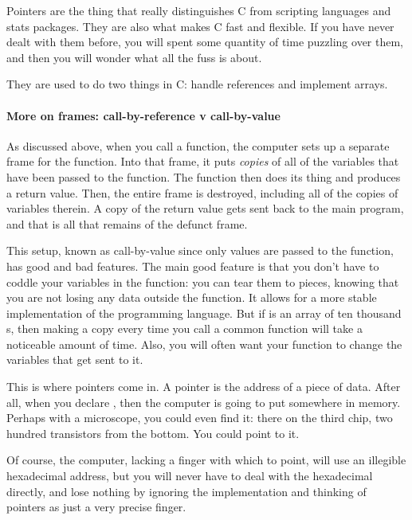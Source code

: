 \documentclass[12pt]{article}
\def\ind#1{\index{#1}#1}
\begin{document}
Pointers are the thing that really distinguishes C from scripting
languages and stats packages. They are also what makes C fast and
flexible. If you have never dealt with them before, you will spent some
quantity of time puzzling over them, and then you will wonder what all the
fuss is about. 

They are used to do two things in C: handle references and implement arrays.

\paragraph{More on \ind{frames}: \ind{call-by-reference} v \ind{call-by-value}}

As discussed above,
when you call a function, the computer sets up a separate frame
for the function. Into that frame, it puts {\it copies} of all of the
variables that have been passed to the function. The function then does its
thing and produces a return value. Then, the entire frame is destroyed,
including all of the copies of variables therein. A copy of the return value gets
sent back to the main program, and that is all that remains of the defunct
frame. 

This setup, known as call-by-value since only values are passed to the
function, has good and bad features. The main good feature is that you
don't have to coddle your variables in the function: you can tear them to
pieces, knowing that you are not losing any data outside the function. It
allows for a more stable implementation of the programming language. But if 
is an array of ten thousand s, then making a copy every time
you call a common function will take a noticeable amount of time. Also,
you will often want your function to change the variables that get
sent to it.

This is where pointers come in. A pointer is the address of a piece of
data. After all, when you declare , then the computer is
going to put  somewhere in memory. Perhaps with a microscope,
you could even find it: there on the third chip, two hundred transistors
from the bottom. You could point to it.

Of course, the computer, lacking a finger with which to point, will use
an illegible hexadecimal address, but you will never have to deal with
the hexadecimal directly, and lose nothing by ignoring the implementation
and thinking of pointers as just a very precise finger.
\end{document}
